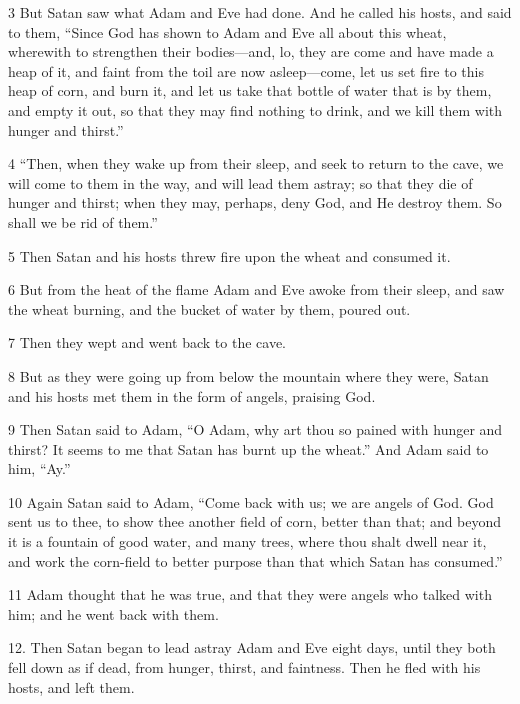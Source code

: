 \par 3 But Satan saw what Adam and Eve had done. And he called his hosts, and said to them, “Since God has shown to Adam and Eve all about this wheat, wherewith to strengthen their bodies—and, lo, they are come and have made a heap of it, and faint from the toil are now asleep—come, let us set fire to this heap of corn, and burn it, and let us take that bottle of water that is by them, and empty it out, so that they may find nothing to drink, and we kill them with hunger and thirst.”

\par 4 “Then, when they wake up from their sleep, and seek to return to the cave, we will come to them in the way, and will lead them astray; so that they die of hunger and thirst; when they may, perhaps, deny God, and He destroy them. So shall we be rid of them.”

\par 5 Then Satan and his hosts threw fire upon the wheat and consumed it.

\par 6 But from the heat of the flame Adam and Eve awoke from their sleep, and saw the wheat burning, and the bucket of water by them, poured out.

\par 7 Then they wept and went back to the cave.

\par 8 But as they were going up from below the mountain where they were, Satan and his hosts met them in the form of angels, praising God.

\par 9 Then Satan said to Adam, “O Adam, why art thou so pained with hunger and thirst? It seems to me that Satan has burnt up the wheat.” And Adam said to him, “Ay.”

\par 10 Again Satan said to Adam, “Come back with us; we are angels of God. God sent us to thee, to show thee another field of corn, better than that; and beyond it is a fountain of good water, and many trees, where thou shalt dwell near it, and work the corn-field to better purpose than that which Satan has consumed.”

\par 11 Adam thought that he was true, and that they were angels who talked with him; and he went back with them.

\par 12. Then Satan began to lead astray Adam and Eve eight days, until they both fell down as if dead, from hunger, thirst, and faintness. Then he fled with his hosts, and left them.

